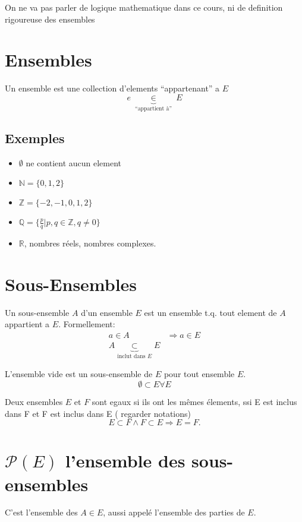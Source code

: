 \documentclass[../main.tex]{subfiles}
\begin{document}
On ne va pas parler de logique mathematique dans ce cours, ni de definition rigoureuse des ensembles

\section{Ensembles}
Un ensemble est une collection d'elements ``appartenant'' a $E$
\[ 
	e \underbrace{\in}_{\text{ ``appartient à'' }} E
\]

\subsection{Exemples}
\begin{itemize}
	\item $\emptyset$ ne contient aucun element\\
	\item $ \mathbb{N} = \{ 0,1,2 \}$\\
	\item $\mathbb{Z} = \{-2,-1,0,1,2\}$\\
	\item $\mathbb{Q} = \{ \frac{p}{q} \vert p,q \in \mathbb{Z}, q \neq 0 \}$
	\item $\mathbb{R}$, nombres réels, nombres complexes.
\end{itemize}
\section{Sous-Ensembles}
Un sous-ensemble $A$ d'un ensemble $E$ est un ensemble t.q. tout element de $A$ appartient a $E$.
Formellement:
\begin{align*}
	a \in A &\Rightarrow a \in E\\
	A \underbrace{ \subset }_{ \text{inclut dans $E$}} E
\end{align*}

L'ensemble vide est un sous-ensemble de $E$ pour tout ensemble $E$.\\
\[ 
\emptyset \subset E \forall E
\]


Deux ensembles $E$ et $F$ sont egaux si ils ont les mêmes élements, ssi
E est inclus dans F et F est inclus dans E ( regarder  notations)
\[ 
E \subset F \land F \subset E \Rightarrow E = F.
\]

\section{$\mathcal{P}(E)$ l'ensemble des sous-ensembles}
C'est l'ensemble des $A \in E$, aussi appelé l'ensemble des parties de $E$.
\end{document}
